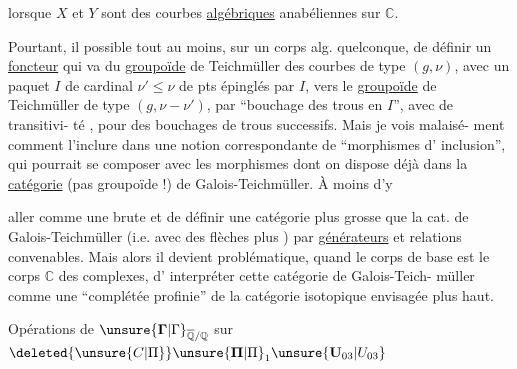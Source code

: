 lorsque $X$ et $Y$ sont des courbes \uline{algébriques}
anabéliennes sur $\mathbb C$.

Pourtant, il   possible tout au
moins, sur un corps alg.  quelconque,
de définir un \uline{foncteur} qui va du
\uline{groupoïde} de Teichmüller des
courbes de type $(g,\nu)$,  avec un
paquet  $I$ de cardinal $\nu'\leq\nu$ de
pts épinglés par $I$, vers le \uline{groupoïde}
de Teichmüller de type $(g,\nu-\nu')$,
par ``bouchage des trous en $I$'', 
avec   de transitivi-
té , pour des bouchages de
trous successifs. Mais je vois malaisé-
ment comment l'inclure dans une
notion correspondante de ``morphismes d'
inclusion'', qui pourrait se composer
avec les morphismes dont on dispose
déjà dans la \uline{catégorie} (pas groupoïde !)
de Galois-Teichmüller. À moins d'y

aller comme une brute et de définir
une catégorie plus grosse que la cat.
de Galois-Teichmüller (i.e. avec
des flèches plus ) par \uline{générateurs}
et relations convenables. Mais alors il
devient problématique, quand le corps de
base est le corps $\mathbb C$ des complexes, d'
interpréter cette catégorie de Galois-Teich-
müller comme une ``complétée profinie''
de la catégorie isotopique envisagée plus
haut.

Opérations de $\unsure{\mathbf{\Gamma}|\Gamma}_{\overline{\mathbb Q}/\mathbb Q}$
sur $\deleted{\unsure{C|\Pi}}\unsure{\mathbf{\Pi}|\Pi}_1\unsure{\mathbf U_{03}|U_{03}}$

